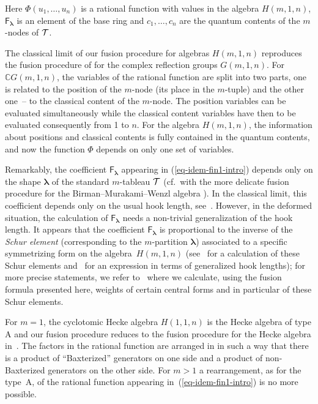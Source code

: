 \documentclass[pdftex]{sigma}
\newcommand{\C}{\mathbb{C}}
\newcommand{\lam}{\boldsymbol{\lambda}}
\begin{document}
Here $\Phi(u_1,\dots,u_{n})$ is a rational function with values in the algebra $H(m,1,n)$, $\mathsf{F}_{\lam}$ is an element of the base ring and $c_1,\dots,c_{n}$ are the quantum contents of the $m$-nodes of ${\cal{T}}$.

The classical limit of our fusion procedure for algebras $H(m,1,n)$
reproduces the fusion procedure of \cite{OPdA} for the complex ref\/lection groups $G(m,1,n)$.
 For  $\C G(m,1,n)$, the variables of the rational function are split into
two parts, one is related to the position of the $m$-node (its place in the $m$-tuple) and the other one~--
to the classical content of the $m$-node.
The position variables can be evaluated simultaneously while the classical content variables have then to be
evaluated consequently from 1 to $n$. For the algebra $H(m,1,n)$, the information about positions and classical contents is fully contained in the quantum contents, and now the function $\Phi$ depends on only one set of variables.


Remarkably, the coef\/f\/icient $\mathsf{F}_{\lam}$ appearing in (\ref{eq-idem-fin1-intro})
depends only on the shape $\lam$ of the standard $m$-tableau ${\cal{T}}$ (cf.\ with the more delicate
fusion  procedure for the Birman--Murakami--Wenzl algebra \cite{IMO3}). In the classical limit, this coef\/f\/icient depends only on the usual hook length,
see~\cite{OPdA}. However, in the deformed situation, the calculation of $\mathsf{F}_{\lam}$ needs a non-trivial generalization of the hook length. It appears that the coef\/f\/icient $\mathsf{F}_{\lam}$ is proportional to the inverse of the {\it Schur element} (corresponding to the $m$-partition $\lam$) associated to a specif\/ic
symmetrizing form on the algebra~$H(m,1,n)$
(see~\cite{GIM,M} for a calculation of these Schur elements and~\cite{CJ} for an expression in terms of generalized hook lengths);
for more precise statements, we refer to~\cite{OPdA2} where we calculate, using the fusion formula presented here,
weights of certain central forms and in particular of these Schur elements.

For $m=1$, the cyclotomic Hecke algebra $H(1,1,n)$ is the Hecke algebra of type A and
our fusion procedure reduces to the fusion procedure for the Hecke algebra in~\cite{IMO}.
The factors in the rational function are arranged in \cite{IMO} in such a way that there is
a product of ``Baxterized'' generators on one side and a product of non-Baxterized generators on the other side.
{}For $m>1$ a rearrangement, as for the type~A, of the rational function appearing in~(\ref{eq-idem-fin1-intro}) is no more possible.
\end{document}
